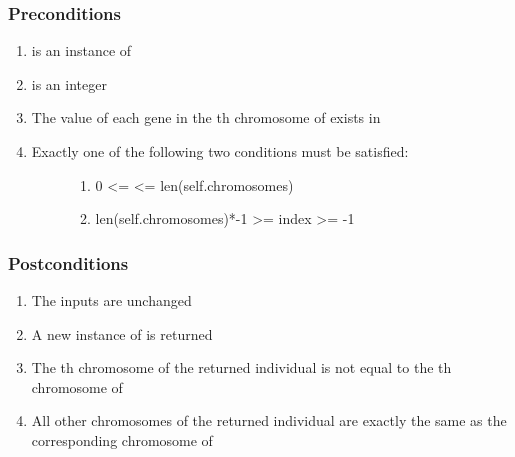 \documentclass[letterpaper,10pt,english]{sphinxmanual}
\begin{document}
\subsubsection{Preconditions}
\label{contracts:id39}\begin{enumerate}
\item {} 
 is an instance of 

\item {} 
 is an integer

\item {} 
The value of each gene in the  th chromosome of  exists in 

\item {} \begin{description}
\item[{Exactly one of the following two conditions must be satisfied:}] \leavevmode\begin{enumerate}
\item {} 
0 \textless{}=  \textless{}= len(self.chromosomes)

\item {} 
len(self.chromosomes)*-1 \textgreater{}= index \textgreater{}= -1

\end{enumerate}

\end{description}

\end{enumerate}


\subsubsection{Postconditions}
\label{contracts:id40}\begin{enumerate}
\item {} 
The inputs are unchanged

\item {} 
A new instance of  is returned

\item {} 
The  th chromosome of the returned individual is not equal to the  th chromosome of 

\item {} 
All other chromosomes of the returned individual are exactly the same as the corresponding chromosome of 

\end{enumerate}
\end{document}
